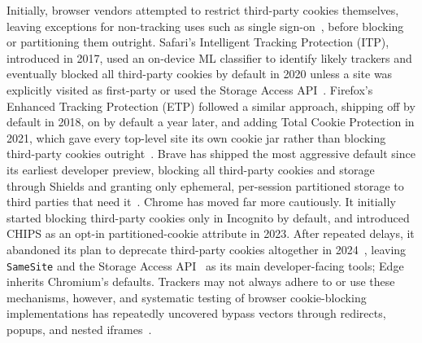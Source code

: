%
Initially, browser vendors attempted to restrict third-party cookies themselves, leaving exceptions for non-tracking uses such as single sign-on~\cite{crouchImprovingPrivacyBreaking2018}, before blocking or partitioning them outright.
%
Safari's Intelligent Tracking Protection (ITP), introduced in 2017, used an on-device ML classifier to identify likely trackers and eventually blocked all third-party cookies by default in 2020 unless a site was explicitly visited as first-party or used the Storage Access API~\cite{TrackingPreventionWebKit2020}.
%
Firefox's Enhanced Tracking Protection (ETP) followed a similar approach, shipping off by default in 2018, on by default a year later, and adding Total Cookie Protection in 2021, which gave every top-level site its own cookie jar rather than blocking third-party cookies outright~\cite{mdnThirdpartyCookiesPrivacy2024}.
%
Brave has shipped the most aggressive default since its earliest developer preview, blocking all third-party cookies and storage through Shields and granting only ephemeral, per-session partitioned storage to third parties that need it~\cite{braveprivacyteamEphemeralThirdpartySite2021}.
%
Chrome has moved far more cautiously. 
%
It initially started blocking third-party cookies only in Incognito by default, and introduced CHIPS as an opt-in partitioned-cookie attribute in 2023. 
%
After repeated delays, it abandoned its plan to deprecate third-party cookies altogether in 2024~\cite{chavezNewPathPrivacy2024}, leaving \texttt{SameSite} and the Storage Access API~\cite{mdnStorageAccessAPI2024,mdnSetCookieHTTPMDN2024} as its main developer-facing tools; Edge inherits Chromium's defaults.
%
Trackers may not always adhere to or use these mechanisms, however, and systematic testing of browser cookie-blocking implementations has repeatedly uncovered bypass vectors through redirects, popups, and nested iframes~\cite{frankenWhoLeftOpen2018}.


